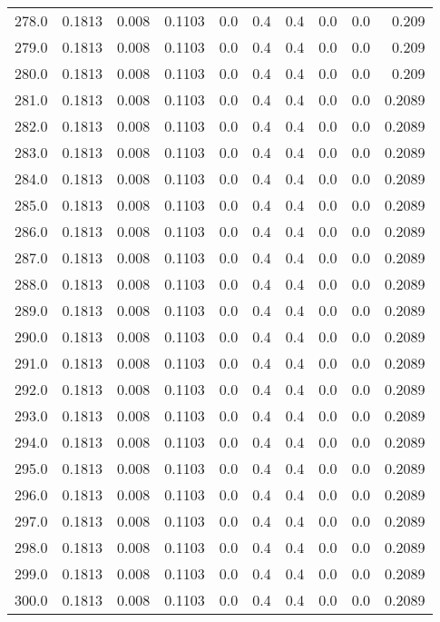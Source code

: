 \begin{longtable}{lrrrrrrrrr}
278.0 & 0.1813 & 0.008 & 0.1103 & 0.0 & 0.4 & 0.4 & 0.0 & 0.0 & 0.209 \\
279.0 & 0.1813 & 0.008 & 0.1103 & 0.0 & 0.4 & 0.4 & 0.0 & 0.0 & 0.209 \\
280.0 & 0.1813 & 0.008 & 0.1103 & 0.0 & 0.4 & 0.4 & 0.0 & 0.0 & 0.209 \\
281.0 & 0.1813 & 0.008 & 0.1103 & 0.0 & 0.4 & 0.4 & 0.0 & 0.0 & 0.2089 \\
282.0 & 0.1813 & 0.008 & 0.1103 & 0.0 & 0.4 & 0.4 & 0.0 & 0.0 & 0.2089 \\
283.0 & 0.1813 & 0.008 & 0.1103 & 0.0 & 0.4 & 0.4 & 0.0 & 0.0 & 0.2089 \\
284.0 & 0.1813 & 0.008 & 0.1103 & 0.0 & 0.4 & 0.4 & 0.0 & 0.0 & 0.2089 \\
285.0 & 0.1813 & 0.008 & 0.1103 & 0.0 & 0.4 & 0.4 & 0.0 & 0.0 & 0.2089 \\
286.0 & 0.1813 & 0.008 & 0.1103 & 0.0 & 0.4 & 0.4 & 0.0 & 0.0 & 0.2089 \\
287.0 & 0.1813 & 0.008 & 0.1103 & 0.0 & 0.4 & 0.4 & 0.0 & 0.0 & 0.2089 \\
288.0 & 0.1813 & 0.008 & 0.1103 & 0.0 & 0.4 & 0.4 & 0.0 & 0.0 & 0.2089 \\
289.0 & 0.1813 & 0.008 & 0.1103 & 0.0 & 0.4 & 0.4 & 0.0 & 0.0 & 0.2089 \\
290.0 & 0.1813 & 0.008 & 0.1103 & 0.0 & 0.4 & 0.4 & 0.0 & 0.0 & 0.2089 \\
291.0 & 0.1813 & 0.008 & 0.1103 & 0.0 & 0.4 & 0.4 & 0.0 & 0.0 & 0.2089 \\
292.0 & 0.1813 & 0.008 & 0.1103 & 0.0 & 0.4 & 0.4 & 0.0 & 0.0 & 0.2089 \\
293.0 & 0.1813 & 0.008 & 0.1103 & 0.0 & 0.4 & 0.4 & 0.0 & 0.0 & 0.2089 \\
294.0 & 0.1813 & 0.008 & 0.1103 & 0.0 & 0.4 & 0.4 & 0.0 & 0.0 & 0.2089 \\
295.0 & 0.1813 & 0.008 & 0.1103 & 0.0 & 0.4 & 0.4 & 0.0 & 0.0 & 0.2089 \\
296.0 & 0.1813 & 0.008 & 0.1103 & 0.0 & 0.4 & 0.4 & 0.0 & 0.0 & 0.2089 \\
297.0 & 0.1813 & 0.008 & 0.1103 & 0.0 & 0.4 & 0.4 & 0.0 & 0.0 & 0.2089 \\
298.0 & 0.1813 & 0.008 & 0.1103 & 0.0 & 0.4 & 0.4 & 0.0 & 0.0 & 0.2089 \\
299.0 & 0.1813 & 0.008 & 0.1103 & 0.0 & 0.4 & 0.4 & 0.0 & 0.0 & 0.2089 \\
300.0 & 0.1813 & 0.008 & 0.1103 & 0.0 & 0.4 & 0.4 & 0.0 & 0.0 & 0.2089 \\

\end{longtable}

